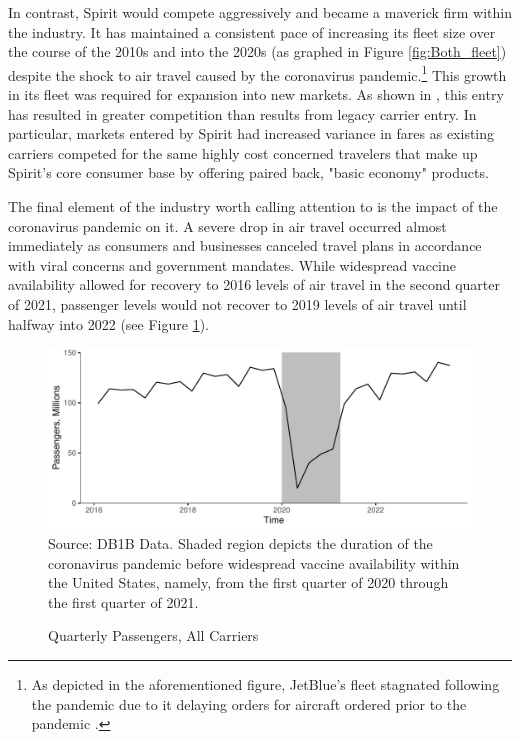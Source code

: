 \documentclass{article}
\begin{document}
	In contrast, Spirit would compete aggressively and became a maverick firm within the industry. It has maintained a consistent pace of increasing its fleet size over the course of the 2010s and into the 2020s (as graphed in Figure \ref{fig:Both_fleet}) despite the shock to air travel caused by the coronavirus pandemic.\footnote{As depicted in the aforementioned figure, JetBlue's fleet stagnated following the pandemic due to it delaying orders for aircraft ordered prior to the pandemic \citep{bellamy_iii_jetblue_2020, sipinski_jetblue_2020}.} This growth in its fleet was required for expansion into new markets. As shown in \citet{shrago_spirit_2024}, this entry has resulted in greater competition than results from legacy carrier entry. In particular, markets entered by Spirit had increased variance in fares as existing carriers competed for the same highly cost concerned travelers that make up Spirit's core consumer base by offering paired back, "basic economy" products.
	
	The final element of the industry worth calling attention to is the impact of the coronavirus pandemic on it.  A severe drop in air travel occurred almost immediately as consumers and businesses canceled travel plans in accordance with viral concerns and government mandates. While widespread vaccine availability allowed for recovery to 2016 levels of air travel in the second quarter of 2021, passenger levels would not recover to 2019 levels of air travel until halfway into 2022 (see Figure \ref{fig:QuarterlyPass}). 

\begin{figure}
	\caption{Quarterly Passengers, All Carriers}
	\label{fig:QuarterlyPass}
	\includegraphics[width = \linewidth]{Quarterly_DB1B_Itineraries}
	\footnotesize{Source: DB1B Data. Shaded region depicts the duration of the coronavirus pandemic before widespread vaccine availability within the United States, namely, from the first quarter of 2020 through the first quarter of 2021.}
\end{figure}
    
\end{document}
